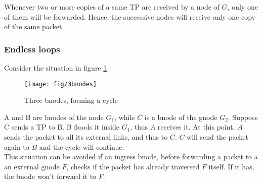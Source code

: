 \documentclass[a4paper]{article}
\begin{document}
Whenever two or more copies of a same TP are received by a node
of $G$, only one of them will be forwarded. Hence, the successive nodes will
receive only one copy of the same packet.

\subsubsection{Endless loops}
Consider the situation in figure \ref{fig:3bnodes}.
\begin{figure}[h]
	\begin{center}
		\texttt{[image: fig/3bnodes]}
	\end{center}
	\caption{Three bnodes, forming a cycle}
	\label{fig:3bnodes}
\end{figure}
A and B are bnodes of the node $G_1$, while $C$ is a bnode of the gnode $G_2$.
Suppose C sends a TP to B. B floods it inside $G_1$, thus $A$ receives it. At
this point, $A$ sends the packet to all its external links, and thus to $C$.
$C$ will send the packet again to $B$ and the cycle will continue.\\

This situation can be avoided if an ingress bnode, before forwarding a packet to a an
external gnode $F$, checks if the packet has already traversed $F$ itself. If
it has, the bnode won't forward it to $F$.
\end{document}
